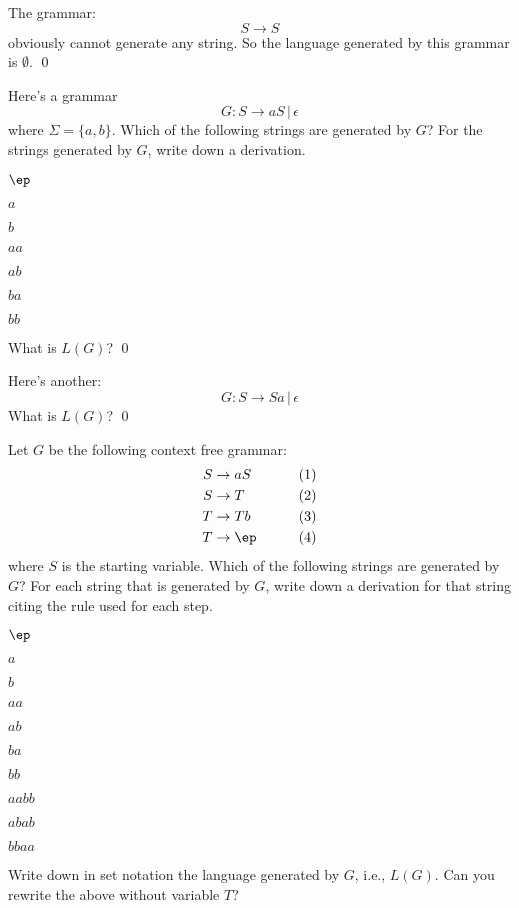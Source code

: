 \begin{eg}
The grammar:
\[
S \rightarrow S
\]
obviously cannot generate any string. So the language generated by this 
grammar is $\emptyset$.
\qed
\end{eg}


\newpage
\begin{ex}
Here's a grammar
\[
G : S \rightarrow aS \,|\, \epsilon
\]
where $\Sigma = \{a, b\}$.
Which of the following strings are generated by $G$?
For the strings generated by $G$, write down a derivation.
\begin{tightlist}
\item $\ep$
\item $a$
\item $b$
\item $aa$
\item $ab$
\item $ba$
\item $bb$
\end{tightlist}
What is $L(G)$?
\qed
\end{ex}
\vspace{2in}

\begin{ex}
Here's another:
\[
G : S \rightarrow Sa \,|\, \epsilon
\]
What is $L(G)$?
\qed
\end{ex}


\newpage
\begin{ex}
Let $G$ be the following context free grammar:
\begin{align*}
  S &\rightarrow aS & \tag{1} \\
  S &\rightarrow T  & \tag{2} \\
  T &\rightarrow Tb & \tag{3} \\
  T &\rightarrow \ep & \tag{4} \\
\end{align*}
where $S$ is the starting variable.
Which of the following strings are generated by $G$?
For each string that is generated by $G$, write down a derivation for
that string citing the rule used for each step.
\begin{tightlist}
\item $\ep$
\item $a$
\item $b$
\item $aa$
\item $ab$
\item $ba$
\item $bb$
\item $aabb$
\item $abab$
\item $bbaa$
\end{tightlist}
Write down in set notation the language generated by $G$, i.e., $L(G)$.
Can you rewrite the above without variable $T$?
\end{ex}

